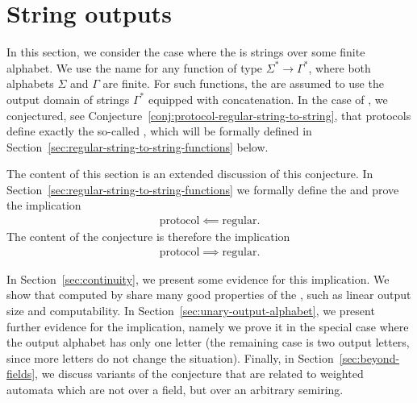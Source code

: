 \section{String outputs}
\label{sec:string-outputs}
\AP
In this section, we consider the case where the  is strings over
some finite alphabet. We use the name  for any
function of type $\Sigma^* \to \Gamma^*$, where both alphabets $\Sigma$ and
$\Gamma$ are finite. For such functions, the  are assumed to use the
output domain of strings $\Gamma^*$ equipped with concatenation. In the case of
, we conjectured, see
Conjecture~\ref{conj:protocol-regular-string-to-string},  that protocols define
exactly the so-called , which will be formally defined in
Section~\ref{sec:regular-string-to-string-functions} below.
 


The content of this section is an extended discussion of this conjecture.
In Section~\ref{sec:regular-string-to-string-functions} we  formally
define the  and  prove the implication 
\begin{align*}
\text{protocol} \impliedby \text{regular}.
\end{align*}
The content of the conjecture is therefore the implication 
\begin{align*}
\text{protocol} \implies \text{regular}.
\end{align*}

In Section~\ref{sec:continuity}, we present some evidence for this implication.
We show that  computed by  share
many good properties of the , such as linear output size
and computability. In Section~\ref{sec:unary-output-alphabet}, we present
further evidence for the implication, namely we  prove it in the special case
where the output alphabet has only one letter (the remaining case is two output
letters, since more letters do not change the situation). Finally, in
Section~\ref{sec:beyond-fields}, we discuss variants of the conjecture that are
related to weighted automata which are not over a field, but over an arbitrary
semiring. 





